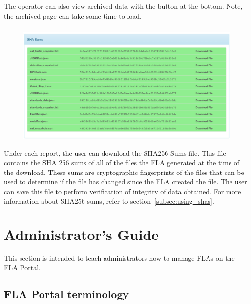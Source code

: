 \documentclass[11pt, oneside]{book}
\begin{document}
\paragraph{  }
The operator can also view archived data with the button at the bottom. Note, the archived page can take some time to load.
\paragraph{  }
\begin{figure}
\centering
\includegraphics[width=1\linewidth]{../media/fla_preview_screenshots/sha_sums}
\end{figure}
Under each report, the user can download the SHA256 Sums file.
This file contains the SHA 256 sums of all of the files the FLA generated at the time of the download. These sums are cryptographic fingerprints of the files that can be used to determine if the file has changed since the FLA created the file. The user can save this file to perform verification of integrity of data obtained. For more information about SHA256 sums, refer to section~\ref{subsec:using_shas}.


\chapter{Administrator's Guide}\label{chap:admin_guide}

This section is intended to teach administrators how to manage FLAs
on the FLA Portal.


\section{FLA Portal terminology}
\end{document}
